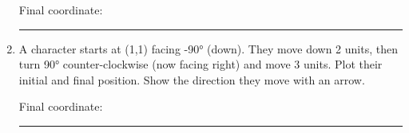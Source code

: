 \documentclass{article}
\begin{document}
\begin{enumerate}
    Final coordinate: \rule{3cm}{0.4pt}
    
    \item A character starts at (1,1) facing -90° (down). They move down 2 units, then turn 90° counter-clockwise (now facing right) and move 3 units. Plot their initial and final position. Show the direction they move with an arrow.
    
    \begin{center}
    \end{center}
    
    Final coordinate: \rule{3cm}{0.4pt}
\end{enumerate}
\end{document}
